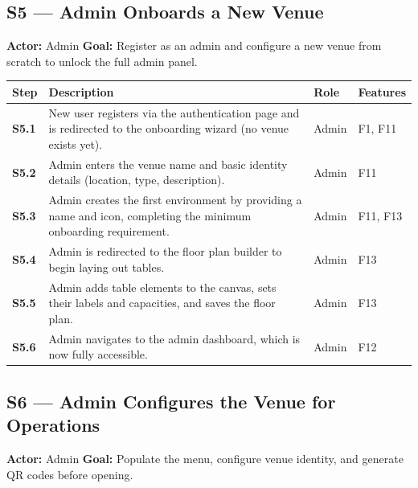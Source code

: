 \documentclass[12pt,a4paper]{article}
\begin{document}
\subsection*{S5 --- Admin Onboards a New Venue}
\begin{mdframed}[style=scenariobox]
\textbf{Actor:} Admin \quad
\textbf{Goal:} Register as an admin and configure a new venue from scratch
to unlock the full admin panel.
\end{mdframed}

\begin{longtable}{>{\bfseries}l L{6.5cm} l L{3cm}}
    \toprule
    Step & Description & Role & Features \\
    \midrule
    S5.1 & New user registers via the authentication page and is
           redirected to the onboarding wizard (no venue exists yet). & Admin & F1, F11 \\
    S5.2 & Admin enters the venue name and basic identity details
           (location, type, description). & Admin & F11 \\
    S5.3 & Admin creates the first environment by providing a name and
           icon, completing the minimum onboarding requirement. & Admin & F11, F13 \\
    S5.4 & Admin is redirected to the floor plan builder to begin
           laying out tables. & Admin & F13 \\
    S5.5 & Admin adds table elements to the canvas, sets their labels
           and capacities, and saves the floor plan. & Admin & F13 \\
    S5.6 & Admin navigates to the admin dashboard, which is now fully
           accessible. & Admin & F12 \\
    \bottomrule
\end{longtable}

\subsection*{S6 --- Admin Configures the Venue for Operations}
\begin{mdframed}[style=scenariobox]
\textbf{Actor:} Admin \quad
\textbf{Goal:} Populate the menu, configure venue identity, and generate
QR codes before opening.
\end{mdframed}
\end{document}
